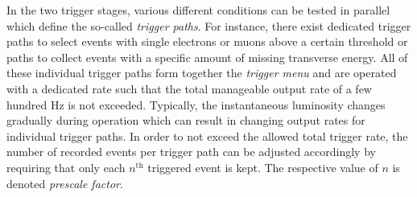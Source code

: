In the two trigger stages, various different conditions can be tested in parallel which define the so-called \textit{trigger paths}. For instance, there exist dedicated trigger paths to select events with single electrons or muons above a certain \pt threshold or paths to collect events with a specific amount of missing transverse energy. All of these individual trigger paths form together the \textit{trigger menu} and are operated with a dedicated rate such that the total manageable output rate of a few hundred Hz is not exceeded. Typically, the instantaneous luminosity changes gradually during operation which can result in changing output rates for individual trigger paths. In order to not exceed the allowed total trigger rate, the number of recorded events per trigger path can be adjusted accordingly by requiring that only each $n^\mathrm{th}$ triggered event is kept. The respective value of $n$ is denoted \textit{prescale factor}. 

